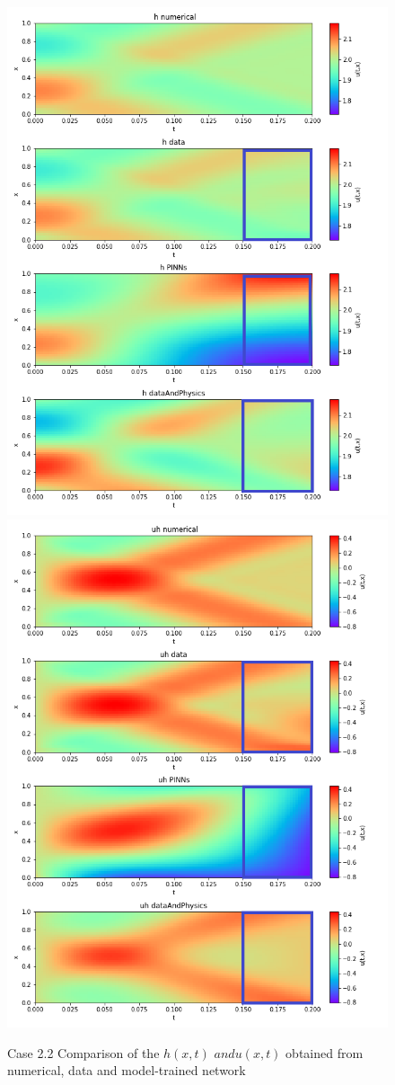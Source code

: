 \begin{figure}[t!]
\begin{center}
\includegraphics[width=0.45\linewidth]{../Code/B3/plots/h_colormap_b2.png}
\includegraphics[width=0.45\linewidth]{../Code/B3/plots/uh_colormap_b2.png}
\end{center}
\caption{Case 2.2  Comparison of the $h(x,t)$ $and u(x,t)$ obtained from numerical, data and model-trained network}\label{fig:b2_swe_sol}
\end{figure}




